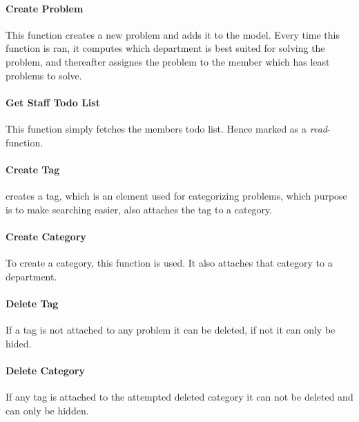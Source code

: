 \paragraph{Create Problem} This function creates a new problem and adds it to the model. Every time this function is ran, it computes which department is best suited for solving the problem, and thereafter assignes the problem to the \astaff[] member which has least problems to solve.  


\paragraph{Get Staff Todo List} This function simply fetches the \astaff[] members todo list. Hence marked as a \textit{read}-function. 

\paragraph{Create Tag} creates a tag, which is an element used for categorizing problems, which purpose is to make searching easier, also attaches the tag to a category.

\paragraph{Create Category} To create a category, this function is used. It also attaches that category to a department. 

\paragraph{Delete Tag} If a tag is not attached to any problem it can be deleted, if not it can only be hided. 

\paragraph{Delete Category} If any tag is attached to the attempted deleted category it can not be deleted and can only be hidden. 

